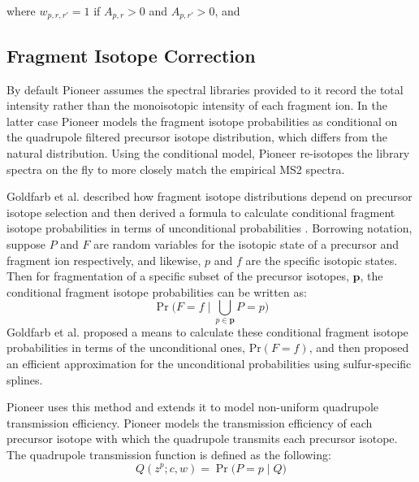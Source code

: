 \documentclass[pdflatex,sn-nature]{sn-jnl}
\begin{document}
where $w_{p,r,r'} = 1$ if $A_{p,r} > 0$ and $A_{p,r'} > 0$, and 

\subsection{Fragment Isotope Correction}\label{subsec:fragment-isotope-correction}

By default Pioneer assumes the spectral libraries provided to it record the total intensity rather than the monoisotopic intensity of each fragment ion. In the latter case Pioneer models the fragment isotope probabilities as conditional on the quadrupole filtered precursor isotope distribution, which differs from the natural distribution.  Using the conditional model, Pioneer re-isotopes the library spectra on the fly to more closely match the empirical MS2 spectra. 

Goldfarb et al. described how fragment isotope distributions depend on precursor isotope selection and then derived a formula to calculate conditional fragment isotope probabilities in terms of unconditional probabilities \cite{Goldfarb2018-ai}. Borrowing notation, suppose $P$ and $F$ are random variables for the isotopic state of a precursor and fragment ion respectively, and likewise, $p$ and $f$ are the specific isotopic states. Then for fragmentation of a specific subset of the precursor isotopes, $\mathbf{p}$, the conditional fragment isotope probabilities can be written as:  
\begin{equation}
    \Pr\bigl( F=f \mid \bigcup\limits_{p\in \boldsymbol{p}} P = p \bigr)
\end{equation}
Goldfarb et al. proposed a means to calculate these conditional fragment isotope probabilities in terms of the unconditional ones, $\text{Pr}(F = f)$, and then proposed an efficient approximation for the unconditional probabilities using sulfur-specific splines. 

Pioneer uses this method and extends it to model non-uniform  quadrupole transmission efficiency. Pioneer models the transmission efficiency of each precursor isotope with which the quadrupole transmits each precursor isotope. The quadrupole transmission function is defined as the following:
\begin{equation}
    Q(z^{p}; c, w) = \Pr\bigl( P=p \mid Q)
\end{equation}
\end{document}
